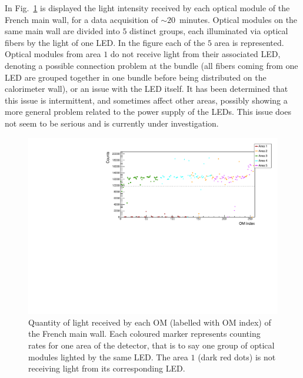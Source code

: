In Fig.~\ref{fig:LI_counts} is displayed the light intensity received by each optical module of the French main wall, for a data acquisition of $\sim20$~minutes.
Optical modules on the same main wall are divided into $5$ distinct groups, each illuminated via optical fibers by the light of one LED.
In the figure each of the $5$ area is represented.
Optical modules from area $1$ do not receive light from their associated LED, denoting a possible connection problem at the bundle (all fibers coming from one LED are grouped together in one bundle before being distributed on the calorimeter wall), or an issue with the LED itself.
It has been determined that this issue is intermittent, and sometimes affect other areas, possibly showing a more general problem related to the power supply of the LEDs.
This issue does not seem to be serious and is currently under investigation.
\begin{figure}[h!]
  \centering
  \includegraphics[width=15cm]{commissioning/fig_commissioning/LI_1d_counts.pdf}
  \caption{Quantity of light received by each OM (labelled with OM index) of the French main wall.
    Each coloured marker represents counting rates for one area of the detector, that is to say one group of optical modules lighted by the same LED.
    The area $1$ (dark red dots) is not receiving light from its corresponding LED.
    \label{fig:LI_counts}}
\end{figure}

